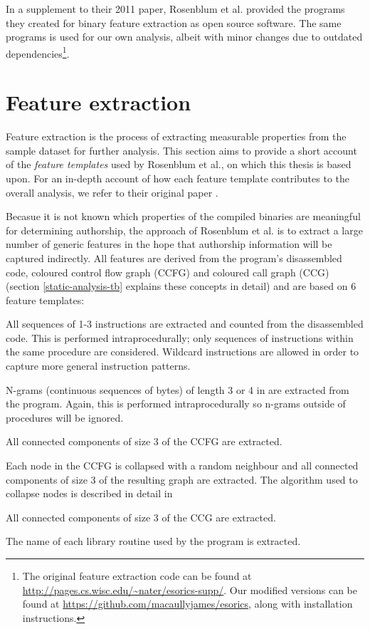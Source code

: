 \documentclass[a4paper,11pt]{kth-mag}
\begin{document}
In a supplement to their 2011 paper, Rosenblum et al. provided the programs
they created for binary feature extraction as open source software. The same programs is used for our own analysis, albeit with minor changes due to
outdated dependencies\footnote{
    The original feature extraction code can be found at
    \url{http://pages.cs.wisc.edu/~nater/esorics-supp/}. Our modified versions
    can be found at \url{https://github.com/macaullyjames/esorics}, along with
    installation instructions.
}.

\section{Feature extraction}
Feature extraction is the process of extracting measurable properties from the
sample dataset for further analysis. This section aims to provide a short
account of the \emph{feature templates} used by Rosenblum et al., on which this
thesis is based upon. For an in-depth account of how each feature template contributes
to the overall analysis, we refer to their original paper
\parencite{rosenblum2011wrote}.

Becasue it is not known which properties of the compiled binaries are
meaningful for determining authorship, the approach of Rosenblum et al. is to
extract a large number of generic features in the hope that authorship
information will be captured indirectly. All features are derived from the
program's disassembled code, coloured control flow graph (CCFG) and coloured
call graph (CCG) (section \ref{static-analysis-tb} explains these concepts in
detail) and are based on 6 feature templates: 

\begin{description}[style=nextline]
\item[Idioms]
All sequences of 1-3 instructions are extracted and counted from the
disassembled code. This is performed intraprocedurally; only sequences of
instructions within the same procedure are considered. Wildcard instructions
are allowed in order to capture more general instruction patterns.

\item[N-grams]
N-grams (continuous sequences of bytes) of length 3 or 4 in are extracted from
the program. Again, this is performed intraprocedurally so n-grams outside of
procedures will be ignored.

\item[Graphlets]
All connected components of size 3 of the CCFG are extracted.

\item[Supergraphlets]
Each node in the CCFG is collapsed with a random neighbour and all connected
components of size 3 of the resulting graph are extracted. The algorithm used
to collapse nodes is described in detail in \parencite{rosenblum2011recovering} 

\item[Call graphlets]
All connected components of size 3 of the CCG are extracted.

\item[External interaction]
The name of each library routine used by the program is extracted.
\end{description}
\end{document}
